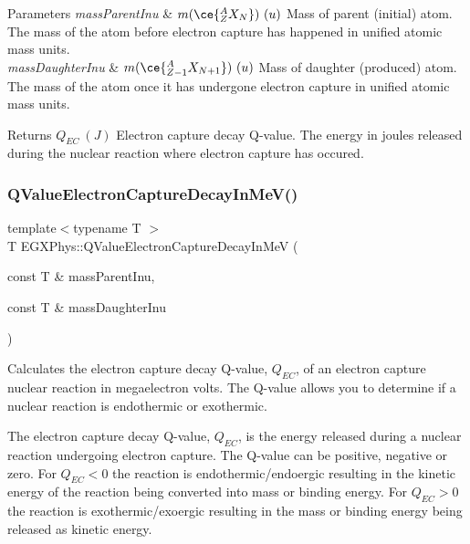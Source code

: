 \begin{DoxyParams}{Parameters}
{\em mass\+Parent\+Inu} & $m(\ce{ ^{A}_{Z}X_{N} })\ (u)$ Mass of parent (initial) atom. The mass of the atom before electron capture has happened in unified atomic mass units. \\
\hline
{\em mass\+Daughter\+Inu} & $m(\ce{ ^{A}_{Z-1}X_{N{+1}} })\ (u)$ Mass of daughter (produced) atom. The mass of the atom once it has undergone electron capture in unified atomic mass units. \\
\hline
\end{DoxyParams}
\begin{DoxyReturn}{Returns}
$Q_{EC}\ (J)$ Electron capture decay Q-\/value. The energy in joules released during the nuclear reaction where electron capture has occured. 
\end{DoxyReturn}
\mbox{\label{group___e_g_x_phys-_q_value_ga9a6b76207e2ec60fd0ee3511582f9e26}} 
\subsubsection{\texorpdfstring{Q\+Value\+Electron\+Capture\+Decay\+In\+Me\+V()}{QValueElectronCaptureDecayInMeV()}}
{\footnotesize\ttfamily template$<$typename T $>$ \\
T E\+G\+X\+Phys\+::\+Q\+Value\+Electron\+Capture\+Decay\+In\+MeV (\begin{DoxyParamCaption}\item[{const T \&}]{mass\+Parent\+Inu,  }\item[{const T \&}]{mass\+Daughter\+Inu }\end{DoxyParamCaption})}



Calculates the electron capture decay Q-\/value, $Q_{EC}$, of an electron capture nuclear reaction in megaelectron volts. The Q-\/value allows you to determine if a nuclear reaction is endothermic or exothermic. 

The electron capture decay Q-\/value, $Q_{EC}$, is the energy released during a nuclear reaction undergoing electron capture. The Q-\/value can be positive, negative or zero. For $Q_{EC} < 0$ the reaction is endothermic/endoergic resulting in the kinetic energy of the reaction being converted into mass or binding energy. For $Q_{EC} > 0$ the reaction is exothermic/exoergic resulting in the mass or binding energy being released as kinetic energy.

